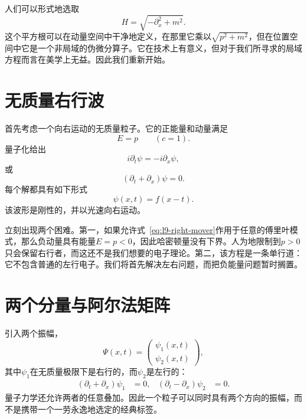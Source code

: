 人们可以形式地选取
\begin{equation}
H=\sqrt{-\partial_x^2+m^2}.
\end{equation}
这个平方根可以在动量空间中干净地定义，在那里它乘以\(\sqrt{p^2+m^2}\)，但在位置空间中它是一个非局域的伪微分算子。它在技术上有意义，但对于我们所寻求的局域方程而言在美学上无益。因此我们重新开始。

\section{无质量右行波}

首先考虑一个向右运动的无质量粒子。它的正能量和动量满足
\begin{equation}
E=p
\qquad (c=1).
\end{equation}
量子化给出
\begin{equation}
i\partial_t\psi=-i\partial_x\psi,
\end{equation}
或
\begin{equation}
(\partial_t+\partial_x)\psi=0.
\label{eq:l9-right-mover}
\end{equation}
每个解都具有如下形式
\begin{equation}
\psi(x,t)=f(x-t).
\end{equation}
该波形是刚性的，并以光速向右运动。

立刻出现两个困难。第一，如果允许式~\eqref{eq:l9-right-mover}作用于任意的傅里叶模式，那么负动量具有能量\(E=p<0\)，因此哈密顿量没有下界。人为地限制到\(p>0\)只会保留右行者，而这还不是我们想要的电子理论。第二，该方程是一条单行道：它不包含普通的左行电子。我们将首先解决左右问题，而把负能量问题暂时搁置。

\section{两个分量与阿尔法矩阵}

引入两个振幅，
\begin{equation}
\Psi(x,t)=
\begin{pmatrix}
\psi_1(x,t)\\[3pt]
\psi_2(x,t)
\end{pmatrix},
\end{equation}
其中\(\psi_1\)在无质量极限下是右行的，而\(\psi_2\)是左行的：
\begin{align}
(\partial_t+\partial_x)\psi_1&=0,
&
(\partial_t-\partial_x)\psi_2&=0.
\end{align}
量子力学还允许两者的任意叠加。因此一个粒子可以同时具有两个方向的振幅，而不是携带一个一劳永逸地选定的经典标签。


